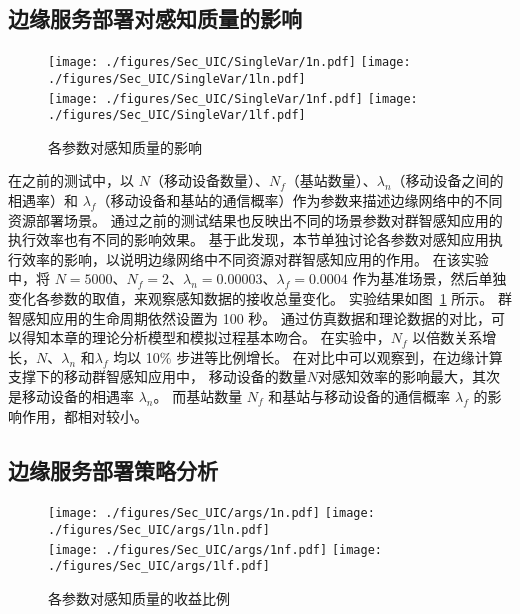 \subsection{边缘服务部署对感知质量的影响}

\begin{figure}[!b]
  \centering
	{\texttt{[image: ./figures/Sec\_UIC/SingleVar/1n.pdf]}}
	{\texttt{[image: ./figures/Sec\_UIC/SingleVar/1ln.pdf]}}\\
	{\texttt{[image: ./figures/Sec\_UIC/SingleVar/1nf.pdf]}}
	{\texttt{[image: ./figures/Sec\_UIC/SingleVar/1lf.pdf]}}
	\vspace{-1em}
	\caption{各参数对感知质量的影响}
	\label{Figure_SingleValTest}
\end{figure}

在之前的测试中，以 $N$（移动设备数量）、$N_f$（基站数量）、$\lambda_n$（移动设备之间的相遇率）和 $\lambda_f$（移动设备和基站的通信概率）作为参数来描述边缘网络中的不同资源部署场景。
通过之前的测试结果也反映出不同的场景参数对群智感知应用的执行效率也有不同的影响效果。
基于此发现，本节单独讨论各参数对感知应用执行效率的影响，以说明边缘网络中不同资源对群智感知应用的作用。
在该实验中，将 $N=5000$、$N_f=2$、$\lambda_n = 0.00003$、$\lambda_f=0.0004$ 作为基准场景，然后单独变化各参数的取值，来观察感知数据的接收总量变化。
实验结果如图~\ref{Figure_SingleValTest} 所示。
群智感知应用的生命周期依然设置为 100 秒。
通过仿真数据和理论数据的对比，可以得知本章的理论分析模型和模拟过程基本吻合。
在实验中，$N_f$ 以倍数关系增长，$N$、$\lambda_n$ 和$\lambda_f$ 均以 10\% 步进等比例增长。
在对比中可以观察到，在边缘计算支撑下的移动群智感知应用中，
移动设备的数量$N$对感知效率的影响最大，其次是移动设备的相遇率 $\lambda_n$。
而基站数量 $N_f$ 和基站与移动设备的通信概率 $\lambda_f$ 的影响作用，都相对较小。

\subsection{边缘服务部署策略分析}
\label{ISPA:结论}

\begin{figure}[!b]
  \centering
	{\texttt{[image: ./figures/Sec\_UIC/args/1n.pdf]}}
	{\texttt{[image: ./figures/Sec\_UIC/args/1ln.pdf]}}\\
	{\texttt{[image: ./figures/Sec\_UIC/args/1nf.pdf]}}
	{\texttt{[image: ./figures/Sec\_UIC/args/1lf.pdf]}}
	\vspace{-1em}
	\caption{各参数对感知质量的收益比例}
	\label{Figure_SingleVal}
\end{figure}


